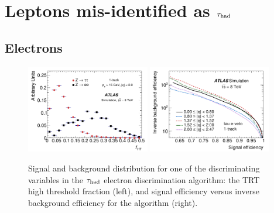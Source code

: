 \section{Leptons mis-identified as $\tau_\text{had}$}
\label{sec:taus-leptonfakes}

\subsection{Electrons}

\begin{figure}[tp]
  \centering
  \includegraphics[width=0.48\textwidth]{figures/PERF-2013-06/fig_08a}
  \includegraphics[width=0.48\textwidth]{figures/PERF-2013-06/fig_09}
  \caption{Signal and background distribution for one of the discriminating variables in the $\tau_\text{had}$ electron discrimination algorithm: the TRT high threshold fraction (left), and signal efficiency versus inverse background efficiency for the algorithm (right).}
  \label{fig:taus-electronfakes1}
\end{figure}

